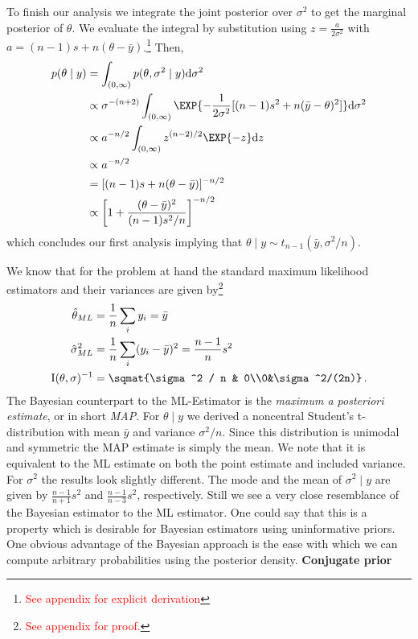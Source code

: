 To finish our analysis we integrate the joint posterior over $\sigma^2$ to get
the marginal posterior of $\theta$. We evaluate the integral by substitution using
$z = \frac{a}{2 \sigma^2}$ with $a = (n-1)s + n(\theta - \bar{y})$.\footnote{\textcolor{red}{See appendix for explicit derivation}}
Then,
\begin{align}
  p(\theta \mid y) &= \int_{(0, \infty)} p(\theta, \sigma^2 \mid y) \mathrm{d}\sigma^2\\
  &\propto \sigma^{-(n+2)} \int_{(0, \infty)} \EXP{-\frac{1}{2\sigma^2}[(n-1) s^2 + n(\bar{y} - \theta)^2]} \mathrm{d} \sigma^2\\
  &\propto a^{-n/2} \int_{(0, \infty)} z^{(n-2)/2}\EXP{-z} \mathrm{d}z\\
  &\propto a^{-n/2}\\
  &= [(n-1)s + n(\theta - \bar{y})]^{-n/2}\\
  &\propto \left[1 + \frac{(\theta - \bar{y})^2}{(n-1) s^2 / n}\right]^{-n/2} \,
\end{align}
which concludes our first analysis implying that $\theta \mid y \sim t_{n-1}(\bar{y}, \sigma^2/n)$.




We know that for the problem at hand the standard maximum likelihood estimators
and their variances are given by\footnote{\textcolor{red}{See appendix for proof.}}
\begin{align}
  \hat{\theta}_{ML} &= \frac{1}{n} \sum_i y_i = \bar{y}\,\\
  \hat{\sigma}_{ML}^2 &= \frac{1}{n} \sum_i (y_i - \bar{y})^2 = \frac{n-1}{n} s^2\,\\
  \mathrm{I}(\theta, \sigma)^{-1} &= \sqmat{\sigma^2 / n & 0\\0&\sigma^2/(2n)} \,.
\end{align}
The Bayesian counterpart to the ML-Estimator is the \emph{maximum a posteriori estimate},
or in short \emph{MAP}. For $\theta \mid y$ we derived a noncentral Student's t-distribution
with mean $\bar{y}$ and variance $\sigma^2/n$. Since this distribution is unimodal and
symmetric the MAP estimate is simply the mean. We note that it is equivalent to
the ML estimate on both the point estimate and included variance. For $\sigma^2$
the results look slightly different. The mode and the mean of $\sigma^2 \mid y$
are given by $\frac{n-1}{n+1} s^2$ and $\frac{n-1}{n-3} s^2$, respectively.
Still we see a very close resemblance of the Bayesian estimator to the ML estimator.
One could say that this is a property which is desirable for Bayesian estimators
using uninformative priors. One obvious advantage of the Bayesian approach is the
ease with which we can compute arbitrary probabilities using the posterior density.
\textbf{Conjugate prior}

